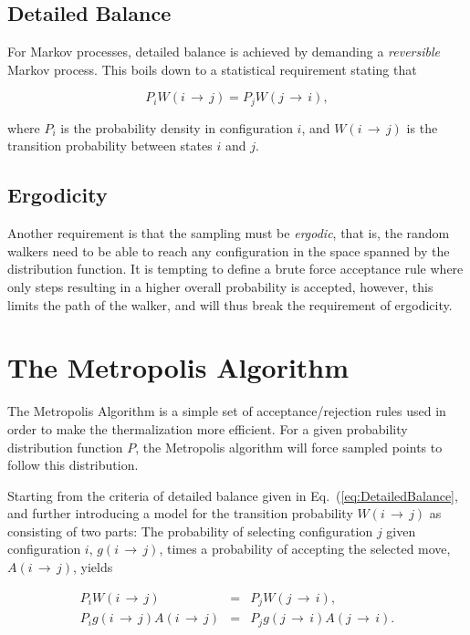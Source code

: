 \subsection{Detailed Balance} 

For Markov processes, detailed balance is achieved by demanding a \textit{reversible} Markov process. This boils down to a statistical requirement stating that 

\begin{equation}
 \label{eq:DetailedBalance}
 P_iW(i\,\rightarrow\,j) = P_jW(j\,\rightarrow\,i),
\end{equation}

where $P_i$ is the probability density in configuration $i$, and $W(i\,\rightarrow\,j)$ is the transition probability between states $i$ and $j$. 

\subsection{Ergodicity}

Another requirement is that the sampling must be \textit{ergodic}, that is, the random walkers need to be able to reach any configuration in the space spanned by the distribution function. It is tempting to define a brute force acceptance rule where only steps resulting in a higher overall probability is accepted, however, this limits the path of the walker, and will thus break the requirement of ergodicity.

\section{The Metropolis Algorithm}
\label{sec:MetroMain}

The Metropolis Algorithm is a simple set of acceptance/rejection rules used in order to make the thermalization more efficient. For a given probability distribution function $P$, the Metropolis algorithm will force sampled points to follow this distribution. 

Starting from the criteria of detailed balance given in Eq.~(\ref{eq:DetailedBalance}, and further introducing a model for the transition probability $W(i\,\rightarrow\,j)$ as consisting of two parts: The probability of selecting configuration $j$ given configuration $i$, $g(i\,\rightarrow\,j)$, times a probability of accepting the selected move, $A(i\,\rightarrow\,j)$, yields

\begin{eqnarray}
 \label{eq:metro1}
 P_iW(i\,\rightarrow\,j) &=& P_jW(j\,\rightarrow\,i), \nonumber \\
 P_ig(i\,\rightarrow\,j)A(i\,\rightarrow\,j) &=& P_jg(j\,\rightarrow\,i)A(j\,\rightarrow\,i).
\end{eqnarray}

